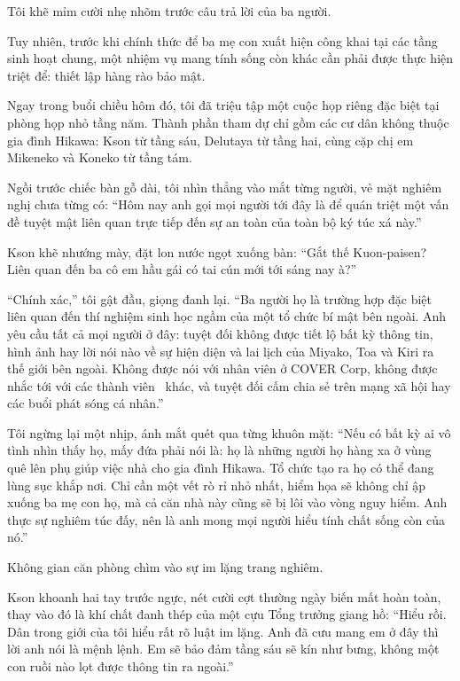 \documentclass[../main.tex]{subfiles}
\begin{document}
Tôi khẽ mỉm cười nhẹ nhõm trước câu trả lời của ba người.

\ct

Tuy nhiên, trước khi chính thức để ba mẹ con xuất hiện công khai tại các tầng sinh hoạt chung, một nhiệm vụ mang tính sống còn khác cần phải được thực hiện triệt để: thiết lập hàng rào bảo mật.

Ngay trong buổi chiều hôm đó, tôi đã triệu tập một cuộc họp riêng đặc biệt tại phòng họp nhỏ tầng năm. Thành phần tham dự chỉ gồm các cư dân không thuộc gia đình Hikawa: Kson từ tầng sáu, Delutaya từ tầng hai, cùng cặp chị em Mikeneko và Koneko từ tầng tám.

Ngồi trước chiếc bàn gỗ dài, tôi nhìn thẳng vào mắt từng người, vẻ mặt nghiêm nghị chưa từng có: ``Hôm nay anh gọi mọi người tới đây là để quán triệt một vấn đề tuyệt mật liên quan trực tiếp đến sự an toàn của toàn bộ ký túc xá này.''

Kson khẽ nhướng mày, đặt lon nước ngọt xuống bàn: ``Gắt thế Kuon-paisen? Liên quan đến ba cô em hầu gái có tai cún mới tới sáng nay à?''

``Chính xác,'' tôi gật đầu, giọng đanh lại. ``Ba người họ là trường hợp đặc biệt liên quan đến thí nghiệm sinh học ngầm của một tổ chức bí mật bên ngoài. Anh yêu cầu tất cả mọi người ở đây: tuyệt đối không được tiết lộ bất kỳ thông tin, hình ảnh hay lời nói nào về sự hiện diện và lai lịch của Miyako, Toa và Kiri ra thế giới bên ngoài. Không được nói với nhân viên ở COVER Corp, không được nhắc tới với các thành viên \hll\ khác, và tuyệt đối cấm chia sẻ trên mạng xã hội hay các buổi phát sóng cá nhân.''

Tôi ngừng lại một nhịp, ánh mắt quét qua từng khuôn mặt: ``Nếu có bất kỳ ai vô tình nhìn thấy họ, mấy đứa phải nói là: họ là những người họ hàng xa ở vùng quê lên phụ giúp việc nhà cho gia đình Hikawa. Tổ chức tạo ra họ có thể đang lùng sục khắp nơi. Chỉ cần một vết rò rỉ nhỏ nhất, hiểm họa sẽ không chỉ ập xuống ba mẹ con họ, mà cả căn nhà này cũng sẽ bị lôi vào vòng nguy hiểm. Anh thực sự nghiêm túc đấy, nên là anh mong mọi người hiểu tính chất sống còn của nó.''

Không gian căn phòng chìm vào sự im lặng trang nghiêm.

Kson khoanh hai tay trước ngực, nét cười cợt thường ngày biến mất hoàn toàn, thay vào đó là khí chất đanh thép của một cựu Tổng trưởng giang hồ: ``Hiểu rồi. Dân trong giới của tôi hiểu rất rõ luật im lặng. Anh đã cưu mang em ở đây thì lời anh nói là mệnh lệnh. Em sẽ bảo đảm tầng sáu sẽ kín như bưng, không một con ruồi nào lọt được thông tin ra ngoài.''
\end{document}
